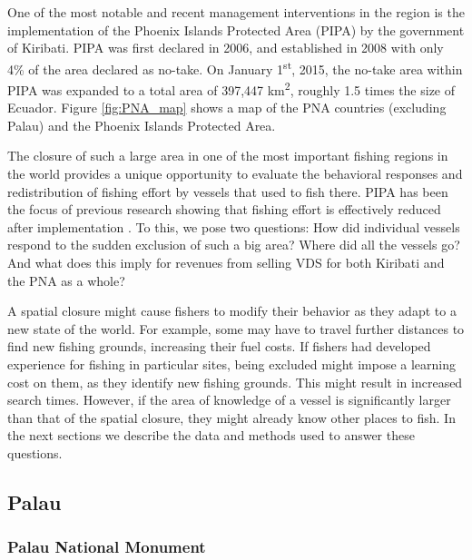 \documentclass[9p,twocolumn,twoside,lineno]{pnas-new}
\begin{document}
One of the most notable and recent management interventions in the
region is the implementation of the Phoenix Islands Protected Area (PIPA)
by the government of Kiribati. PIPA was first declared in 2006, and
established in 2008 with only 4\% of the area declared as no-take. On
January 1\textsuperscript{st}, 2015, the no-take area within PIPA was
expanded to a total area of 397,447 km\textsuperscript{2}, roughly 1.5
times the size of Ecuador. Figure \ref{fig:PNA_map} shows a map of the
PNA countries (excluding Palau) and the Phoenix Islands Protected Area.

The closure of such a large area in one of the most important fishing
regions in the world provides a unique opportunity to evaluate the
behavioral responses and redistribution of fishing effort by vessels
that used to fish there. PIPA has been the focus of previous research
showing that fishing effort is effectively reduced after implementation
\citep{mccauley_2016,mcdermott_2018}. To this, we pose two questions:
How did individual vessels respond to the sudden exclusion of such a big
area? Where did all the vessels go? And what does this imply for revenues from
selling VDS for both Kiribati and the PNA as a whole? 

A spatial closure might cause fishers to modify
their behavior as they adapt to a new state of the world. For example, some may have
to travel further distances to find new fishing grounds, increasing their fuel
costs. If fishers had developed experience for fishing in particular
sites, being excluded might impose a learning cost on them, as they
identify new fishing grounds. This might result in increased search
times. However, if the area of knowledge of a vessel is significantly
larger than that of the spatial closure, they might already know other
places to fish. In the next sections we describe
the data and methods used to answer these questions.

\subsection{Palau}

\subsubsection{Palau National Monument}
\end{document}
